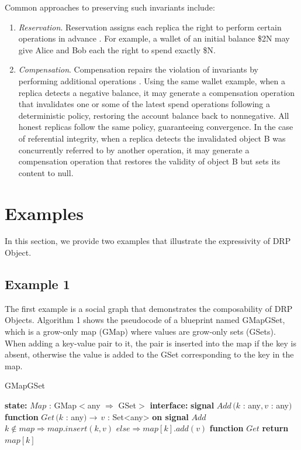 \documentclass{article}
\begin{document}
Common approaches to preserving such invariants include:
\begin{enumerate}
    \item \textit{Reservation}. Reservation assigns each replica the right to perform certain operations in advance \cite{Bounded-CRDT}. For example, a wallet of an initial balance \$2N may give Alice and Bob each the right to spend exactly \$N.
    \item \textit{Compensation}. Compensation repairs the violation of invariants by performing additional operations \cite{IPA}. Using the same wallet example, when a replica detects a negative balance, it may generate a compensation operation that invalidates one or some of the latest spend operations following a deterministic policy, restoring the account balance back to nonnegative. All honest replicas follow the same policy, guaranteeing convergence. In the case of referential integrity, when a replica detects the invalidated object B was concurrently referred to by another operation, it may generate a compensation operation that restores the validity of object B but sets its content to null.
\end{enumerate}

\section{Examples}
\label{sec:headings}

In this section, we provide two examples that illustrate the expressivity of DRP Object.

\subsection{Example 1}

The first example is a social graph that demonstrates the composability of DRP Objects. Algorithm 1 shows the pseudocode of a blueprint named GMapGSet, which is a grow-only map (GMap) where values are grow-only sets (GSets). When adding a key-value pair to it, the pair is inserted into the map if the key is absent, otherwise the value is added to the GSet corresponding to the key in the map.

\begin{algorithm}
\caption{GMapGSet}
\begin{algorithmic}
\State \textbf{state:}
\State \hspace{\algorithmicindent} $Map$ : GMap$<$any $\Rightarrow$ GSet$>$
\State
\State \textbf{interface:}
\State \hspace{\algorithmicindent} \textbf{signal} $Add\,(k$ : any$,v$ : any$)$
\State \hspace{\algorithmicindent} \textbf{function} $Get\,(k$ : any$) \rightarrow\,v$ : Set<any>
\State
\State \textbf{on signal} $Add$
\State\hspace{\algorithmicindent}$k \notin map \Rightarrow map.insert (k,v)$
\State\hspace{\algorithmicindent}$else\Rightarrow map[k].add(v)$
\State
\State \textbf{function} $Get$
\State\hspace{\algorithmicindent}\textbf{return} $map[k]$
\end{algorithmic}
\end{algorithm}
\end{document}
